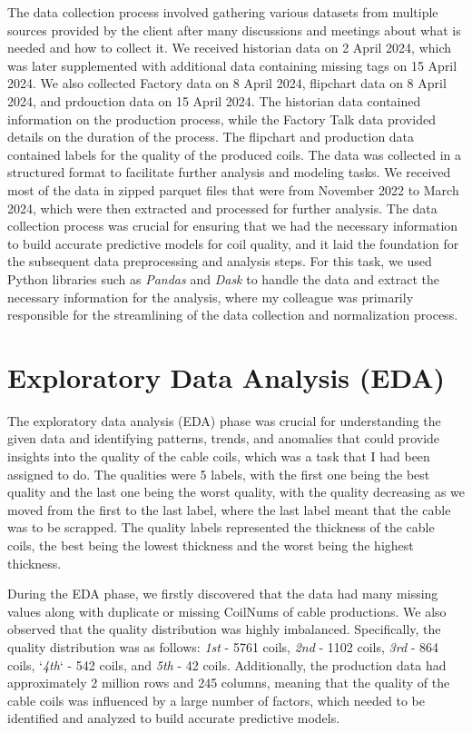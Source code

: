 The data collection process involved gathering various datasets from multiple
sources provided by the client after many discussions and meetings about what
is needed and how to collect it. We received historian data on 2 April 2024,
which was later supplemented with additional data containing missing tags on 15
April 2024. We also collected Factory data on 8 April 2024, flipchart data on 8
April 2024, and prdouction data on 15 April 2024. The historian data contained
information on the production process, while the Factory Talk data provided
details on the duration of the process. The flipchart and production data
contained labels for the quality of the produced coils. The data was collected
in a structured format to facilitate further analysis and modeling tasks. We
received most of the data in zipped parquet files that were from November 2022
to March 2024, which were then extracted and processed for further analysis.
The data collection process was crucial for ensuring that we had the necessary
information to build accurate predictive models for coil quality, and it laid
the foundation for the subsequent data preprocessing and analysis steps. For
this task, we used Python libraries such as \emph{Pandas} and \emph{Dask} to
handle the data and extract the necessary information for the analysis, where
my colleague was primarily responsible for the streamlining of the data
collection and normalization process.

\section{Exploratory Data Analysis (EDA)}

The exploratory data analysis (EDA) phase was crucial for understanding the
given data and identifying patterns, trends, and anomalies that could provide
insights into the quality of the cable coils, which was a task that I had been
assigned to do. The qualities were 5 labels, with the first one being the best
quality and the last one being the worst quality, with the quality decreasing
as we moved from the first to the last label, where the last label meant that
the cable was to be scrapped. The quality labels represented the thickness of
the cable coils, the best being the lowest thickness and the worst being the
highest thickness.

During the EDA phase, we firstly discovered that the data had many missing
values along with duplicate or missing CoilNums of cable productions. We also
observed that the quality distribution was highly imbalanced. Specifically, the
quality distribution was as follows: \emph{1st} - 5761 coils, \emph{2nd} - 1102
coils, \emph{3rd} - 864 coils, `\emph{4th}` - 542 coils, and \emph{5th} - 42
coils. Additionally, the production data had approximately 2 million rows and
245 columns, meaning that the quality of the cable coils was influenced by a
large number of factors, which needed to be identified and analyzed to build
accurate predictive models.

